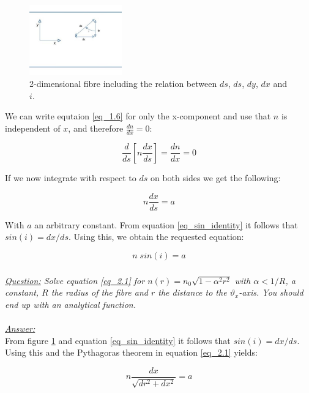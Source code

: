 \documentclass{article}
\begin{document}
\begin{figure}[h!]
	\centering
	\includegraphics[width = 4cm]{afbeeldingen/fibre_2d.jpg}
	\caption{2-dimensional fibre including the relation between $ds$, $ds$, $dy$, $dx$ and $i$.}
	\label{fig_fibre_2d}
\end{figure}

We can write equtaion \ref{eq_1.6} for only the x-component and use that $n$ is independent of $x$, and therefore $\frac{d n}{dx} = 0$:

\begin{equation}
	\frac{d}{ds} \left[ n \frac{d x}{ds} \right] = \frac{d n}{dx} = 0
\end{equation}

If we now integrate with respect to $ds$ on both sides we get the following:

\begin{equation}
	n \frac{d x}{ds} = a
\end{equation}

With $a$ an arbitrary constant. From  equation \ref{eq_sin_identity} it follows that $sin(i) = dx/ds$. Using this, we obtain the requested equation:

\begin{equation}
	n \; sin(i) = a
\end{equation}

\subsubsection{}

\textit{\underline{Question:} Solve equation \ref{eq_2.1} for $n(r) = n_0 \sqrt{1 - \alpha ^2 r^2}$ with $\alpha < 1/R$, a constant, $R$ the radius of the fibre and $r$ the distance to the $\vartheta _x$-axis. You should end up with an analytical function.}\\
\\
\textit{\underline{Answer:}} \\
From figure \ref{fig_fibre_2d} and equation \ref{eq_sin_identity} it follows that $ sin(i) = dx/ds$. Using this and the Pythagoras theorem in equation \ref{eq_2.1} yields:

\begin{equation*}
	n  \frac{dx}{\sqrt{dr^2 + dx^2}} = a
\end{equation*}
\end{document}

